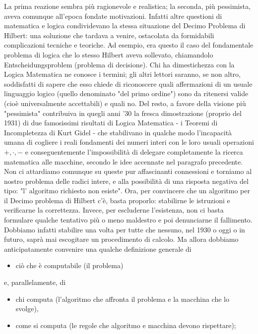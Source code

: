 La prima reazione sembra più ragionevole e realistica; la seconda, più pessimista,
aveva comunque all'epoca fondate motivazioni. Infatti altre questioni di matematica e logica condividevano
la stessa situazione del Decimo Problema di Hilbert: una soluzione che tardava a venire,
ostacolata da formidabili complicazioni tecniche e teoriche. Ad esempio, era questo il caso del fondamentale
problema di logica che lo stesso Hilbert aveva sollevato, chiamandolo Entscheidungsproblem
(problema di decisione). Chi ha dimestichezza con la Logica Matematica ne conosce i termini;
gli altri lettori saranno, se non altro, soddisfatti di sapere che esso chiede di riconoscere quali affermazioni
di un usuale linguaggio logico (quello denominato "del primo ordine") sono da ritenersi valide
(cioè universalmente accettabili) e quali no.
Del resto, a favore della visione più "pessimista" contribuiva in quegli anni '30
la fresca dimostrazione (proprio del 1931) di due famosissimi risultati di
Logica Matematica - i Teoremi di Incompletezza di Kurt Gidel - che stabilivano in qualche modo l'incapacità
umana di cogliere i reali fondamenti dei numeri interi
con le loro usuali operazioni $+, \cdot, -$ e conseguentemente l'impossibilità di delegare completamente la ricerca
matematica alle macchine, secondo le idee accennate nel paragrafo precedente.
Non ci attardiamo comunque su queste pur affascinanti connessioni e torniamo al
nostro problema delle radici intere, e alla possibilità di una risposta negativa del
tipo: "l' algoritmo richiesto non esiste". Ora, per convincere che un algoritmo per
il Decimo problema di Hilbert c'è, basta proporlo: stabilirne le istruzioni e verificarne la correttezza.
Invece, per escluderne l'esistenza, non ci basta formulare
qualche tentativo più o meno maldestro e poi denunciarne il fallimento. Dobbiamo
infatti stabilire una volta per tutte che nessuno, nel 1930 o oggi o in futuro, saprà
mai escogitare un procedimento di calcolo. Ma allora dobbiamo anticipatamente
convenire una qualche definizione generale di

\begin{itemize}
    \item ciò che è computabile (il problema)
\end{itemize}

e, parallelamente, di

\begin{itemize}
    \item chi computa (l'algoritmo che affronta il problema e la macchina che lo svolge),
    \item come si computa (le regole che algoritmo e macchina devono rispettare);
\end{itemize}

